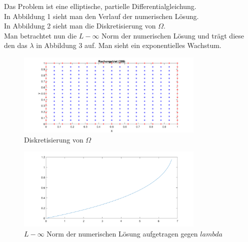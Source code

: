 \documentclass[11pt,a4paper]{article}
\begin{document}
Das Problem ist eine elliptische, partielle Differentialgleichung.\\
  
In Abbildung 1 sieht man den Verlauf der numerischen L\"osung.\\

In Abbildung 2 sieht man die Diskretisierung von $\Omega$.\\

Man betrachtet nun die $L-\infty$ Norm der numerischen L\"osung und trägt diese den das $\lambda$ in Abbildung 3 auf. Man sieht ein exponentielles Wachstum.

\begin{figure}
\includegraphics[width=0.8\textwidth]{bild1}
\caption{Diskretisierung von $\Omega$}
\end{figure}  


\begin{figure}
\includegraphics[width=0.8\textwidth]{bild3}
\caption{$L-\infty$ Norm der numerischen L\"osung aufgetragen gegen $lambda$}
\end{figure}  
\end{document}
